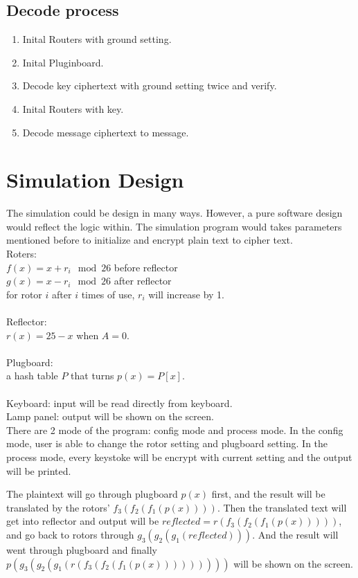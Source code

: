 \documentclass[11pt,a4paper]{article}
\begin{document}
\subsection{Decode process}
\begin{enumerate}
\item Inital Routers with ground setting.
\item Inital Pluginboard.
\item Decode key ciphertext with ground setting twice and verify.
\item Inital Routers with key.
\item Decode message ciphertext to message.
\end{enumerate}

\section{Simulation Design}
The simulation could be design in many ways. However, a pure software design would reflect the logic within. The simulation program would takes parameters mentioned before to initialize and encrypt plain text to cipher text.\\
Roters: \\
$f(x) = x + r_i \mod 26$ before reflector\\
$g(x) = x - r_i \mod 26$ after reflector\\
for rotor $i$ after $i$ times of use, $r_i$ will increase by 1.\\\\
Reflector: \\
$r(x) = 25 - x$ when $A = 0$.\\\\
Plugboard: \\
a hash table $P$ that turns $p(x) = P[x]$.\\\\
Keyboard: input will be read directly from keyboard.\\
Lamp panel: output will be shown on the screen.\\

There are 2 mode of the program: config mode and process mode.
In the config mode, user is able to change the rotor setting and plugboard setting.
In the process mode, every keystoke will be encrypt with current setting and the output will be printed.

The plaintext will go through plugboard $p(x)$ first, and the result will be translated by the rotors' $f_3(f_2(f_1(p(x))))$. Then the translated text will get into reflector and output will be $reflected = r(f_3(f_2(f_1(p(x)))))$, and go back to rotors through $g_3(g_2(g_1(reflected)))$. And the result will went through plugboard and finally $p(g_3(g_2(g_1(r(f_3(f_2(f_1(p(x)))))))))$ will be shown on the screen.
\end{document}
